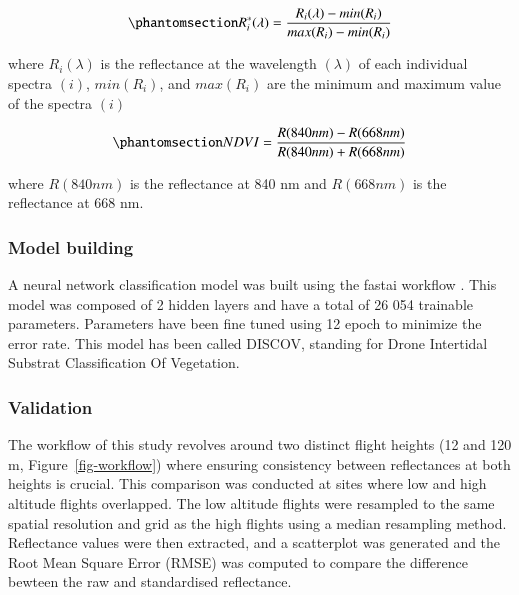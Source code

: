 \documentclass[
  number]{elsarticle}
\begin{document}
\begin{equation}\phantomsection\label{eq-std}{
R_{i}^{*}(\lambda) = \frac{R_{i}(\lambda) - min(R_{i})}{max(R_{i})- min(R_{i})}
}\end{equation}

where \(R_{i}(\lambda)\) is the reflectance at the wavelength
\((\lambda)\) of each individual spectra \((i)\), \(min(R_{i})\), and
\(max(R_{i})\) are the minimum and maximum value of the spectra \((i)\)

\begin{equation}\phantomsection\label{eq-ndvi}{
NDVI = \frac{R(840nm)-R(668nm)}{R(840nm)+R(668nm)}
}\end{equation}

where \(R(840nm)\) is the reflectance at 840 nm and \(R(668nm)\) is the
reflectance at 668 nm.

\subsubsection{Model building}\label{model-building}

A neural network classification model was built using the fastai
workflow \citep{howard2018fastai}. This model was composed of 2 hidden
layers and have a total of 26 054 trainable parameters. Parameters have
been fine tuned using 12 epoch to minimize the error rate. This model
has been called DISCOV, standing for Drone Intertidal Substrat
Classification Of Vegetation.

\subsubsection{Validation}\label{validation}

The workflow of this study revolves around two distinct flight heights
(12 and 120 m, Figure~\ref{fig-workflow}) where ensuring consistency
between reflectances at both heights is crucial. This comparison was
conducted at sites where low and high altitude flights overlapped. The
low altitude flights were resampled to the same spatial resolution and
grid as the high flights using a median resampling method. Reflectance
values were then extracted, and a scatterplot was generated and the Root
Mean Square Error (RMSE) was computed to compare the difference bewteen
the raw and standardised reflectance.
\end{document}
